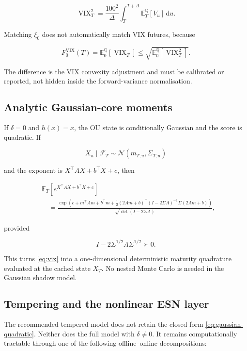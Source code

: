 \documentclass[11pt,a4paper]{article}
\newcommand{\Qq}{\mathbb{Q}}
\newcommand{\E}{\mathbb{E}}
\newcommand{\F}{\mathcal{F}}
\newcommand{\dd}{\,\mathrm{d}}
\newcommand{\VIX}{\operatorname{VIX}}
\begin{document}
\begin{equation}
\VIX_T^2
=\frac{100^2}{\Delta}\int_T^{T+\Delta}
\E_T^{\Qq}[V_u]\dd u.
\label{eq:vix}
\end{equation}

Matching \(\xi_0\) does not automatically match VIX futures, because

\begin{equation}
F_0^{\VIX}(T)=\E_0^{\Qq}[\VIX_T]
\leq\sqrt{\E_0^{\Qq}[\VIX_T^2]}.
\end{equation}

The difference is the VIX convexity adjustment and must be calibrated or reported, not hidden
inside the forward-variance normalisation.

\subsection{Analytic Gaussian-core moments}

If \(\delta=0\) and \(h(x)=x\), the OU state is conditionally Gaussian and the score is
quadratic. If

\begin{equation}
X_u\mid\F_T\sim\mathcal N(m_{T,u},\Sigma_{T,u})
\end{equation}

and the exponent is \(X^\top AX+b^\top X+c\), then

\begin{align}
&\E_T\!\left[e^{X^\top AX+b^\top X+c}\right] \\
&\quad=
\frac{\exp\!\left(
c+m^\top Am+b^\top m
+\tfrac12(2Am+b)^\top(I-2\Sigma A)^{-1}\Sigma(2Am+b)
\right)}
{\sqrt{\det(I-2\Sigma A)}},
\label{eq:gaussian-quadratic}
\end{align}

provided

\begin{equation}
I-2\Sigma^{1/2}A\Sigma^{1/2}\succ0.
\end{equation}

This turns \cref{eq:vix} into a one-dimensional deterministic maturity quadrature evaluated
at the cached state \(X_T\). No nested Monte Carlo is needed in the Gaussian shadow model.

\subsection{Tempering and the nonlinear ESN layer}

The recommended tempered model does not retain the closed form
\cref{eq:gaussian-quadratic}. Neither does the full model with \(\delta\neq0\). It remains
computationally tractable through one of the following offline--online decompositions:
\end{document}
